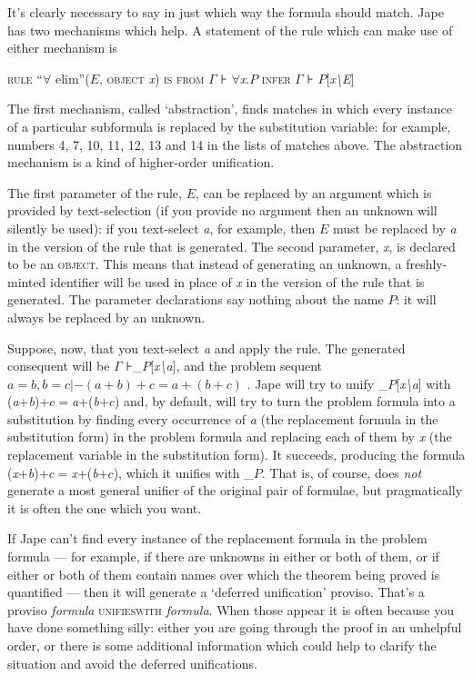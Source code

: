 It's clearly necessary to say in just which way the formula should match. Jape has two mechanisms which help. A statement of the rule which can make use of either mechanism is


\textsc{rule ``}\ensuremath{\forall} elim''($E$, \textsc{object} \textit{x}) \textsc{is from} \ensuremath{\Gamma} ⊦ \ensuremath{\forall}\textit{x}.$P$ \textsc{infer} \ensuremath{\Gamma} ⊦ $P$[\textit{x{\textbackslash}E}]


The first mechanism, called `abstraction', finds matches in which every instance of a particular subformula is replaced by the substitution variable: for example, numbers 4, 7, 10, 11, 12, 13 and 14 in the lists of matches above. The abstraction mechanism is a kind of higher-order unification.


The first parameter of the rule, $E$, can be replaced by an argument which is provided by text-selection (if you provide no argument then an unknown will silently be used): if you text-select \textit{a}, for example, then $E$ must be replaced by \textit{a} in the version of the rule that is generated. The second parameter, \textit{x}, is declared to be an \textsc{object}. This means that instead of generating an unknown, a freshly-minted identifier will be used in place of \textit{x} in the version of the rule that is generated. The parameter declarations say nothing about the name $P$: it will always be replaced by an unknown.


Suppose, now, that you text-select \textit{a} and apply the rule. The generated consequent will be \ensuremath{\Gamma} ⊦\_$P$[\textit{x{\textbackslash}a}], and the problem sequent $a=b,b=c |- (a+b)+c=a+(b+c)$ . Jape will try to unify \_$P$[\textit{x{\textbackslash}a}] with (\textit{a}+\textit{b})+$c$\ensuremath{=}\textit{a}+(\textit{b}+$c$) and, by default, will try to turn the problem formula into a substitution by finding every occurrence of \textit{a} (the replacement formula in the substitution form) in the problem formula and replacing each of them by \textit{x} (the replacement variable in the substitution form). It succeeds, producing the formula (\textit{x}+\textit{b})+$c$\ensuremath{=}\textit{x}+(\textit{b}+$c$), which it unifies with \_$P$. That is, of course, does \textit{not} generate a most general unifier of the original pair of formulae, but pragmatically it is often the one which you want.


If Jape can't find every instance of the replacement formula in the problem formula --- for example, if there are unknowns in either or both of them, or if either or both of them contain names over which the theorem being proved is quantified --- then it will generate a `deferred unification' proviso. That's a proviso \textit{formula} \textsc{unifieswith} \textit{formula}. When those appear it is often because you have done something silly: either you are going through the proof in an unhelpful order, or there is some additional information which could help to clarify the situation and avoid the deferred unifications.


